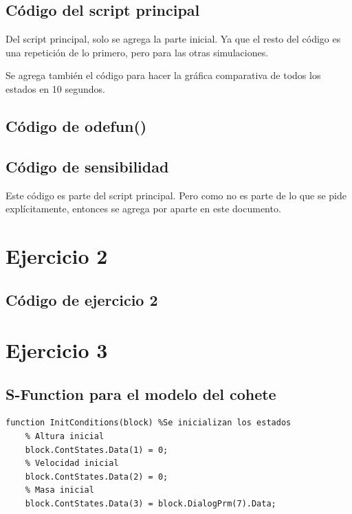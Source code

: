 \documentclass[12pt,letterpaper]{article}
\begin{document}
\subsection{Código del script principal}
Del script principal, solo se agrega la parte inicial. Ya que el resto del código es una repetición de lo primero, pero para las otras simulaciones.


Se agrega también el código para hacer la gráfica comparativa de todos los estados en 10 segundos.


\subsection{Código de odefun()}

\subsection{Código de sensibilidad}
Este código es parte del script principal. Pero como no es parte de lo que se pide explícitamente, entonces se agrega por aparte en este documento.
 





\section{Ejercicio 2}


\subsection{Código de ejercicio 2}

\section{Ejercicio 3}

\subsection{S-Function para el modelo del cohete}

\begin{lstlisting}[style=Matlab-editor, basicstyle=\mlttfamily]
  function InitConditions(block) %Se inicializan los estados
    % Altura inicial
    block.ContStates.Data(1) = 0;
    % Velocidad inicial
    block.ContStates.Data(2) = 0;
    % Masa inicial
    block.ContStates.Data(3) = block.DialogPrm(7).Data;
\end{lstlisting}
\end{document}
